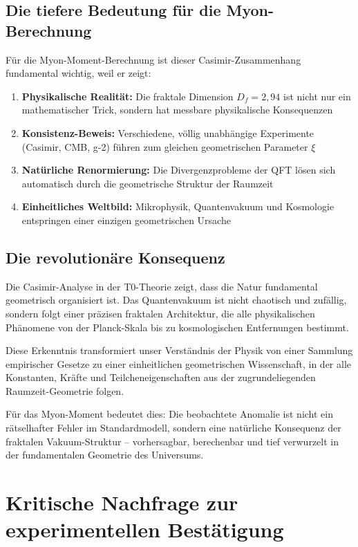 \documentclass[12pt,a4paper]{article}
\begin{document}
		\subsection{Die tiefere Bedeutung f\"ur die Myon-Berechnung}
		
		F\"ur die Myon-Moment-Berechnung ist dieser Casimir-Zusammenhang fundamental wichtig, weil er zeigt:
		\begin{enumerate}
			\item \textbf{Physikalische Realit\"at:} Die fraktale Dimension $D_f = 2{,}94$ ist nicht nur ein mathematischer Trick, sondern hat messbare physikalische Konsequenzen
			\item \textbf{Konsistenz-Beweis:} Verschiedene, v\"ollig unabh\"angige Experimente (Casimir, CMB, g-2) f\"uhren zum gleichen geometrischen Parameter $\xi$
			\item \textbf{Nat\"urliche Renormierung:} Die Divergenzprobleme der QFT l\"osen sich automatisch durch die geometrische Struktur der Raumzeit
			\item \textbf{Einheitliches Weltbild:} Mikrophysik, Quantenvakuum und Kosmologie entspringen einer einzigen geometrischen Ursache
		\end{enumerate}
		
		\subsection{Die revolution\"are Konsequenz}
		
		Die Casimir-Analyse in der T0-Theorie zeigt, dass die Natur fundamental geometrisch organisiert ist. Das Quantenvakuum ist nicht chaotisch und zuf\"allig, sondern folgt einer pr\"azisen fraktalen Architektur, die alle physikalischen Ph\"anomene von der Planck-Skala bis zu kosmologischen Entfernungen bestimmt.
		
		Diese Erkenntnis transformiert unser Verst\"andnis der Physik von einer Sammlung empirischer Gesetze zu einer einheitlichen geometrischen Wissenschaft, in der alle Konstanten, Kr\"afte und Teilcheneigenschaften aus der zugrundeliegenden Raumzeit-Geometrie folgen.
		
		F\"ur das Myon-Moment bedeutet dies: Die beobachtete Anomalie ist nicht ein r\"atselhafter Fehler im Standardmodell, sondern eine nat\"urliche Konsequenz der fraktalen Vakuum-Struktur -- vorhersagbar, berechenbar und tief verwurzelt in der fundamentalen Geometrie des Universums.

	\section{Kritische Nachfrage zur experimentellen Best\"atigung}
	
\end{document}
